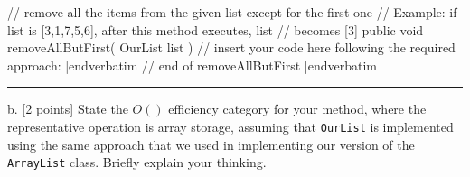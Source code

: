 \verbatim
// remove all the items from the given list except for the first one
//  Example:  if  list is [3,1,7,5,6], after this method executes, list
//                     becomes [3]
public void removeAllButFirst( OurList list )
{  // insert your code here following the required approach:
|endverbatim
\vfil
\verbatim
}// end of removeAllButFirst
|endverbatim
\bigskip
\hrule
\bigskip

\item{b.} [2 points]  State the $O()$ efficiency category for your method, where the
representative operation is array storage, assuming that {\tt OurList} is implemented
using the same approach that we used in implementing our version of the {\tt ArrayList}
class. Briefly explain your thinking.
\vskip 1in

\eject
\bye

